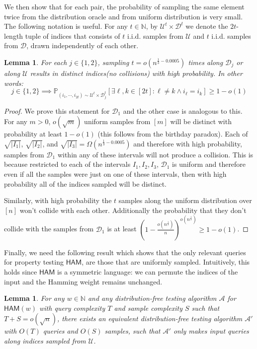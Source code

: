 \documentclass[10pt,a4paper]{article}
\newtheorem{lemma}[theorem]{Lemma}
\newcommand{\HAM}{\mathsf{HAM}}
\newcommand{\N}{\mathbb{N}}
\newcommand{\sU}{\mathcal{U}}
\newcommand{\sD}{\mathcal{D}}
\newcommand{\sA}{\mathcal{A}}
\begin{document}
We then show that for each pair, the probability of sampling the same element twice from the distribution oracle and from uniform distribution is very small. The following notation is useful. For any $t\in \N$, by $\sU^t \times \sD^t$ we denote the $2t$-length tuple of indices that consists of $t$ i.i.d. samples from $\sU$ and $t$ i.i.d. samples from $\sD$, drawn independently of each other.

\begin{lemma}\label{colls}
For each $j\in \{1,2\}$, sampling $t=o(n^{\frac{1}{3}-0.0005})$ times along $\mathcal{D}_{j}$ or along $\sU$ results in distinct indices(no collisions) with high probability. In other words:
\begin{equation}
    j\in\{1,2\}\implies\mathbb{P}_{(i_{1},\cdots, i_{2t})\sim\sU^{t}\times\mathcal{D}_{j}^{t}} \left[ \exists \ell,k\in [2t]:\ell\neq k\wedge i_{\ell}=i_{k} \right] \geq 1-o(1)
\end{equation}
\end{lemma}

\begin{proof}
We prove this statement for $\sD_1$ and the other case is analogous to this. For any $m>0$, $o(\sqrt{m})$ uniform samples from $[m]$ will be distinct with probability at least $1-o(1)$ (this follows from the birthday paradox). Each of $\sqrt{|I_{1}|}$, $\sqrt{|I_{2}|}$, and $\sqrt{|I_{3}|}=\Omega(n^{\frac{1}{3}-0.0005})$ and therefore with high probability, samples from $\sD_1$ within any of these intervals will not produce a collision. This is because restricted to each of the intervals $I_{1}, I_{2}, I_{3}$, $\mathcal{D}_{1}$ is uniform and therefore even if all the samples were just on one of these intervals, then with high probability all of the indices sampled will be distinct. 

Similarly, with high probability the $t$ samples along the uniform distribution over $[n]$ won't collide with each other. Additionally the probability that they don't collide with the samples from $\sD_1$ is at least $\left (1-\frac{o(n^{\frac{1}{3}})}{n}\right)^{o(n^{\frac{1}{3}})} \geq 1-o(1)$.
\end{proof}

Finally, we need the following result which shows that the only relevant queries for property testing $\HAM$, are those that are uniformly sampled. Intuitively, this holds since $\HAM$ is a symmetric language: we can permute the indices of the input and the Hamming weight remains unchanged. 

\begin{lemma}\label{lem:PTSamplingHam}
For any $w\in \mathbb{N}$ and any distribution-free testing algorithm $\sA$ for $\HAM(w)$ with query complexity $T$ and sample complexity $S$ such that $T + S = o(\sqrt{n})$, there exists an equivalent distribution-free testing algorithm $\sA'$ with $O(T)$ queries and $O(S)$ samples, such that $\sA'$ only makes input queries along indices sampled from $\mathcal{U}$.
\end{lemma}
\end{document}
